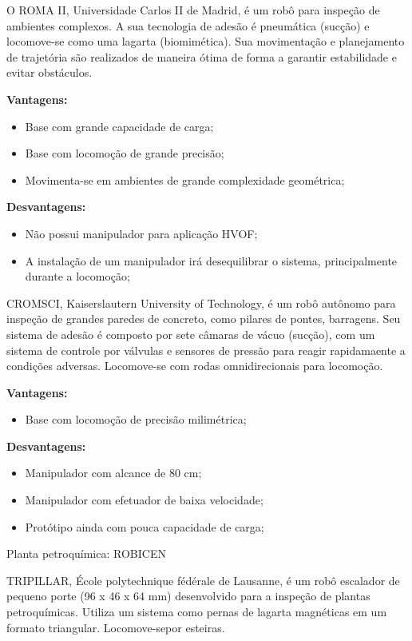O ROMA II, Universidade Carlos II de Madrid, é um robô para inspeção de
ambientes complexos. A sua tecnologia de adesão é pneumática (sucção) e
locomove-se como uma lagarta (biomimética). Sua movimentação e planejamento de
trajetória são realizados de maneira ótima de forma a garantir estabilidade e
evitar obstáculos. 

\textbf{Vantagens:}
\begin{itemize}
  \item Base com grande capacidade de carga;
  \item Base com locomoção de grande precisão;
  \item Movimenta-se em ambientes de grande complexidade geométrica; 
\end{itemize}

\textbf{Desvantagens:}
\begin{itemize}
  \item Não possui manipulador para aplicação HVOF;
  \item A instalação de um manipulador irá desequilibrar o sistema,
  principalmente durante a locomoção;
\end{itemize}


CROMSCI, Kaiserslautern University of Technology, é um robô autônomo para
inspeção de grandes paredes de concreto, como pilares de pontes, barragens. Seu
sistema de adesão é composto por sete câmaras de vácuo (sucção), com um sistema
de controle por válvulas e sensores de pressão para reagir rapidamaente a
condições adversas. Locomove-se com rodas omnidirecionais para locomoção.

\textbf{Vantagens:}
\begin{itemize}
  \item Base com locomoção de precisão milimétrica; 
\end{itemize}

\textbf{Desvantagens:}
\begin{itemize}
  \item Manipulador com alcance de 80 cm;
  \item Manipulador com efetuador de baixa velocidade;
  \item Protótipo ainda com pouca capacidade de carga;
\end{itemize}

Planta petroquímica: ROBICEN

TRIPILLAR, École polytechnique fédérale de Lausanne, é um robô escalador de
pequeno porte (96 x 46 x 64 mm) desenvolvido para a inspeção de plantas
petroquímicas. Utiliza um sistema como pernas de lagarta magnéticas em um
formato triangular. Locomove-sepor esteiras.

